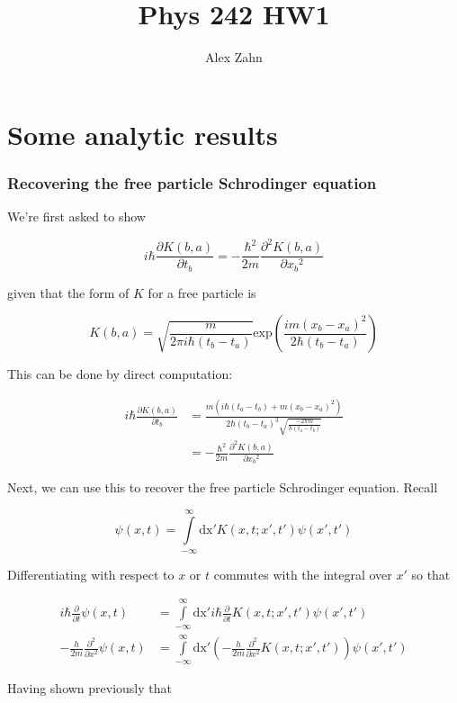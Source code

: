 \documentclass[12pt]{article}
\author{Alex Zahn}
\title{Phys 242 HW1}
\date{}
\begin{document}
\maketitle

\section{Some analytic results}

\subsubsection*{Recovering the free particle Schrodinger equation}

We're first asked to show

\[ i\hbar\frac{\partial K(b,a)}{\partial t_b} = -\frac{\hbar^2}{2m}\frac{\partial^2 K(b,a)}{\partial {x_b}^2}
\]

\noindent given that the form of \(K\) for a free particle is

\[ K(b,a) = \sqrt{\frac{m}{2\pi i \hbar(t_b -t_a)}}\mathrm{exp}\left(\frac{im(x_b-x_a)^2}{2\hbar(t_b-t_a)}\right)
\]

This can be done by direct computation:

\begin{align*}
i\hbar\frac{\partial K(b,a)}{\partial t_b} &= \frac{m(i\hbar(t_a-t_b)+m(x_b-x_a)^2)}{2\hbar(t_b-t_a)^3\sqrt{\frac{-2\pi m}{h(t_a-t_b)}}} \\
&=  -\frac{\hbar^2}{2m}\frac{\partial^2 K(b,a)}{\partial {x_b}^2}
\end{align*}

Next, we can use this to recover the free particle Schrodinger equation. Recall

\[ \psi(x,t) = \int\limits_{-\infty}^{\infty}\mathrm{dx'}K(x,t;x',t')\psi(x',t')
\]

Differentiating with respect to \(x\) or \(t\) commutes with the integral over \(x'\) so that

\begin{align*}
i\hbar\frac{\partial}{\partial t}\psi(x,t) &= \int\limits_{-\infty}^{\infty}\mathrm{dx'}i\hbar\frac{\partial}{\partial t}K(x,t;x',t')\psi(x',t') \\[6pt]
%
-\frac{h}{2m}\frac{\partial^2}{\partial x^2}\psi(x,t) &= \int\limits_{-\infty}^{\infty}\mathrm{dx'}\left(-\frac{h}{2m}\frac{\partial^2}{\partial x^2}K(x,t;x',t')\right)\psi(x',t')
\end{align*}

Having shown previously that
\end{document}
